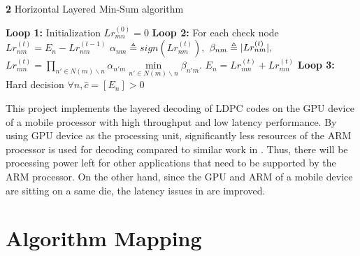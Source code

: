 \documentclass{article}
\DeclarePairedDelimiter\abs{\lvert}{\rvert}%
\begin{document}
\begin{algorithm}
\renewcommand\thealgorithm{}
\caption{\textbf{2} Horizontal Layered Min-Sum algorithm}\label{algorithm2}
\begin{algorithmic}[1]
\STATE \textbf{Loop 1:} Initialization
\STATE
$Lr_{mn}^{(0)}=0$%
\ENDFOR
{}
\STATE \textbf{Loop 2:} For each check node
\STATE$Lr_{nm}^{(t)}=E_n - Lr_{nm}^{(t-1)}$
\ENDFOR
{}
\STATE $\alpha_{nm} \triangleq sign(Lr_{nm}^{(t)}),$
\STATE $\beta_{nm} \triangleq \abs{Lr_{nm}^{(t)}},$
\STATE $Lr_{mn}^{(t)} = \prod\limits_{n' \in N(m)\backslash n} \alpha_{n'm} \min\limits_{n' \in N(m)\backslash n} \beta_{n'm}.$
\ENDFOR
{}
\STATE$E_n = Lr_{nm}^{(t)}+Lr_{mn}^{(t)}$
\ENDFOR
\ENDFOR
\STATE \textbf{Loop 3:} Hard decision
\STATE $\forall n, \hat{c}=[E_n]>0$
\ENDFOR
\ENDFOR %
\end{algorithmic}
\addtocounter{algorithm}{-1}
\end{algorithm}
This project implements the layered decoding of LDPC codes on the GPU device of a mobile processor with high throughput and low latency performance. By using GPU device as the processing unit, significantly less resources of the ARM processor is used for decoding compared to similar work in \cite{art_neon}. Thus, there will be processing power left for other applications that need to be supported by the ARM processor. On the other hand, since the GPU and ARM of a mobile device are sitting on a same die, the latency issues in \cite{art_gpu_0} are improved.
\section{Algorithm Mapping}\label{sec3}
\end{document}
